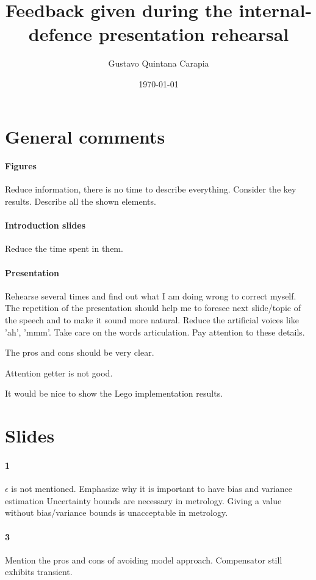 \documentclass[12pt,english]{article}
\title{Feedback given during the \linebreak internal-defence presentation rehearsal}
\author{Gustavo Quintana Carapia}
\date{\today}
\begin{document}
\maketitle



\section{General comments}


\paragraph{Figures}
Reduce information, there is no time to describe everything. Consider the key results. Describe all the shown elements.

\paragraph{Introduction slides}
Reduce the time spent in them.

\paragraph{Presentation}
Rehearse several times and find out what I am doing wrong to correct myself. 
The repetition of the presentation should help me to foresee next slide/topic of the speech and to make it sound more natural. Reduce the artificial voices like 'ah', 'mmm'. Take care on the words articulation. Pay attention to these details.

The pros and cons should be very clear.

Attention getter is not good.

It would be nice to show the Lego implementation  results.

\section{Slides} 

\paragraph{1}
$\epsilon$ is not mentioned.
Emphasize why it is important to have bias and variance estimation
Uncertainty bounds are necessary in metrology.
Giving a value without bias/variance bounds is unacceptable in metrology.

\paragraph{3}
Mention the pros and cons of avoiding model approach. Compensator still exhibits transient.
\end{document}

